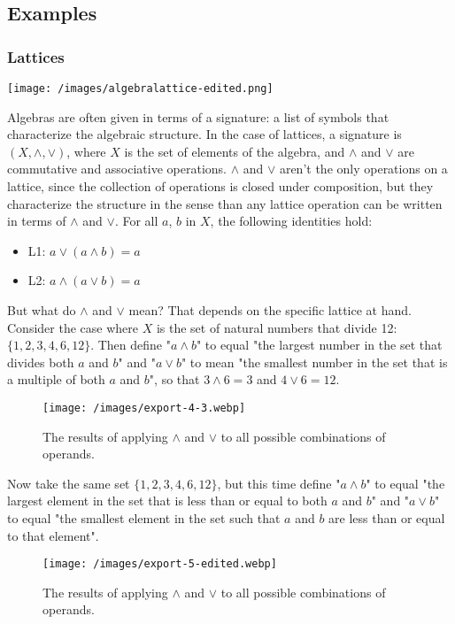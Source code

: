 \documentclass{article}
\begin{document}
\subsection{Examples}

\subsubsection{Lattices}

\texttt{[image: /images/algebralattice-edited.png]}

Algebras are often given in terms of a signature: a list of symbols that characterize the algebraic structure. In the case of lattices, a signature is $ (X, \land, \lor) $, where $ X $ is the set of elements of the algebra, and $ \land$ and $ \lor $ are commutative and associative operations. $ \land $ and $ \lor $ aren't the only operations on a lattice, since the collection of operations is closed under composition, but they characterize the structure in the sense than any lattice operation can be written in terms of $ \land $  and $ \lor$. For all $ a$, $ b$ in $ X$, the following identities hold:

\begin{itemize}
\item{L1: $ a \lor (a \land b) = a$}
\item{L2: $ a\land(a\lor b) = a$}
\end{itemize}

But what do $ \land$ and $ \lor$ mean? That depends on the specific lattice at hand. Consider the case where $ X$ is the set of natural numbers that divide 12: $ \{1, 2, 3, 4, 6, 12\}$. Then define "$ a \land b$" to equal "the largest number in the set that divides both $ a$ and $ b$" and "$ a \lor b$" to mean "the smallest number in the set that is a multiple of both $ a$ and $ b$", so that $ 3 \land 6 = 3$ and $ 4 \lor 6 = 12$.

\begin{figure}
\texttt{[image: /images/export-4-3.webp]}
\caption{The results of applying $ \land$ and $ \lor$ to all possible combinations of operands.}
\end{figure}

Now take the same set $ \{1, 2, 3, 4, 6, 12\}$, but this time define "$ a \land b$" to equal "the largest element in the set that is less than or equal to both $ a$ and $ b$" and "$ a \lor b$" to equal "the smallest element in the set such that $ a$ and $ b$ are less than or equal to that element".

\begin{figure}
\texttt{[image: /images/export-5-edited.webp]}
\caption{The results of applying $ \land$ and $ \lor$ to all possible combinations of operands.}
\end{figure}
\end{document}
